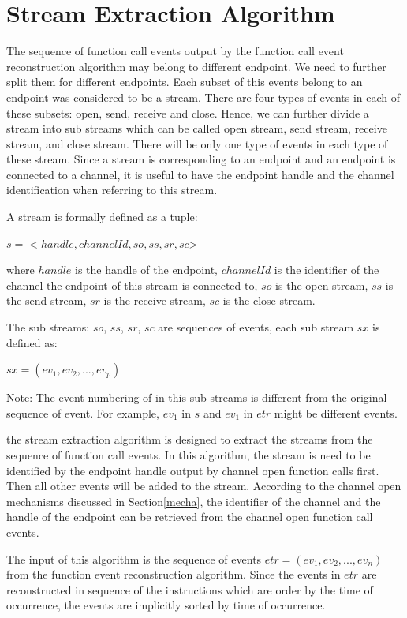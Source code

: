 \section{Stream Extraction Algorithm}
The sequence of function call events output by the function call event reconstruction algorithm may belong to different endpoint. We need to further split them for different endpoints.  Each subset of this events belong to an endpoint was considered to be a stream. There are four types of events in each of these subsets: open, send, receive and close. Hence, we can further divide a stream into sub streams which can be called open stream, send stream, receive stream, and close stream. There will be only one type of events in each type of these stream. Since a stream is corresponding to an endpoint and an endpoint is connected to a channel, it is useful to have the endpoint handle and the channel identification when referring to this stream. 

A  stream is formally defined as a tuple:

$s = <handle, channelId, so, ss, sr, sc$>

where $handle$ is the handle of the endpoint, $channelId$ is the identifier of the channel the endpoint of this stream is connected to, $so$ is the open stream, $ss$ is the send stream, $sr$ is the receive stream, $sc$ is the close stream. 

The sub streams: $so$, $ss$, $sr$, $sc$ are sequences of events, each sub stream $sx$ is defined as:

$sx = (ev_1, ev_2, ..., ev_p)$

Note: The event numbering of in this sub streams is different from the original sequence of event. For example, $ev_1$ in $s$ and $ev_1$ in $etr$ might be different events.

the stream extraction algorithm is designed to extract the streams from the sequence of function call events. In this algorithm, the stream is need to be identified by the endpoint handle output by channel open function calls first. Then all other events will be added to the stream.  According to the channel open mechanisms discussed in Section\ref{mecha}, the identifier of the channel and the handle of the endpoint can be retrieved from the channel open function call events.

The input of this algorithm is the sequence of events $etr = (ev_1, ev_2, ..., ev_n)$ from the function event reconstruction algorithm. Since the events in $etr$ are reconstructed in sequence of the instructions which are order by the time of occurrence, the events are implicitly sorted by time of occurrence. 

